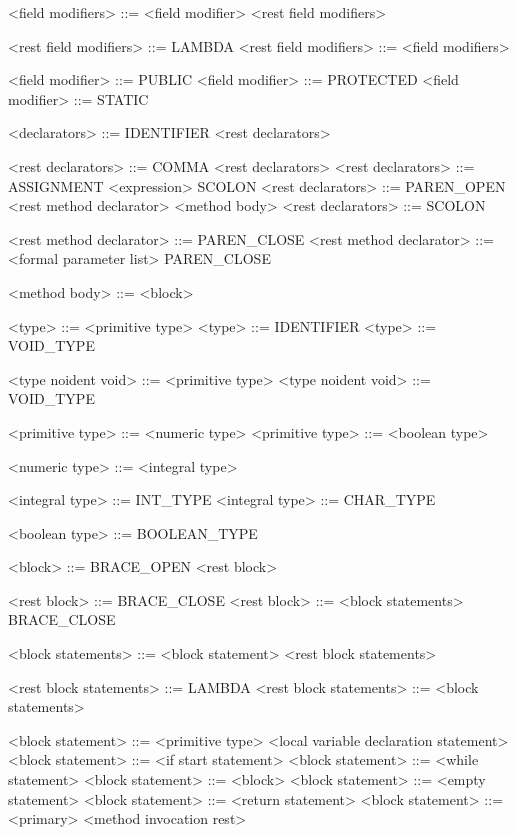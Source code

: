 <field modifiers>              ::= <field modifier> <rest field modifiers>

<rest field modifiers>         ::= LAMBDA
<rest field modifiers>         ::= <field modifiers>

<field modifier>               ::= PUBLIC
<field modifier>               ::= PROTECTED
<field modifier>               ::= STATIC

<declarators>                  ::= IDENTIFIER <rest declarators>

<rest declarators>             ::= COMMA <rest declarators>
<rest declarators>             ::= ASSIGNMENT <expression> SCOLON
<rest declarators>             ::= PAREN_OPEN <rest method declarator> <method body>
<rest declarators>             ::= SCOLON

<rest method declarator>       ::= PAREN_CLOSE
<rest method declarator>       ::= <formal parameter list> PAREN_CLOSE

<method body>                  ::= <block>

<type>              ::= <primitive type>
<type>              ::= IDENTIFIER
<type>              ::= VOID_TYPE

<type noident void> ::= <primitive type>
<type noident void> ::= VOID_TYPE

<primitive type>    ::= <numeric type>
<primitive type>    ::= <boolean type>

<numeric type>      ::= <integral type>

<integral type>     ::= INT_TYPE
<integral type>     ::= CHAR_TYPE

<boolean type>      ::= BOOLEAN_TYPE

<block>                                   ::= BRACE_OPEN <rest block>

<rest block>                              ::= BRACE_CLOSE
<rest block>                              ::= <block statements> BRACE_CLOSE

<block statements>                        ::= <block statement> <rest block statements>

<rest block statements>                   ::= LAMBDA
<rest block statements>                   ::= <block statements>

<block statement>                         ::= <primitive type> <local variable declaration statement>
<block statement>                         ::= <if start statement>
<block statement>                         ::= <while statement>
<block statement>                         ::= <block>
<block statement>                         ::= <empty statement>
<block statement>                         ::= <return statement>
<block statement>                         ::= <primary> <method invocation rest>

